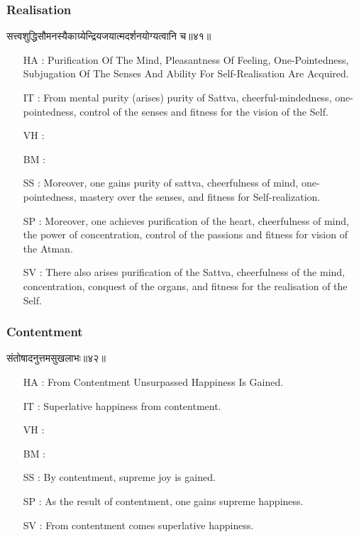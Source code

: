 \begin{frame}[fragile]\frametitle{Realisation}
\begin{sanskrit}
सत्त्वशुद्धिसौमनस्यैकाग्र्येन्द्रियजयात्मदर्शनयोग्यत्वानि च॥४१॥
\end{sanskrit}

	\begin{itemize}
	\item [HA]: Purification Of The Mind, Pleasantness Of Feeling, One-Pointedness, Subjugation Of The Senses And Ability For Self-Realisation Are Acquired.
	\item [IT]: From mental purity (arises) purity of Sattva, cheerful-mindedness, one-pointedness, control of the senses and fitness for the vision of the Self.
	\item [VH]: 
	\item [BM]: 
	\item [SS]: Moreover, one gains purity of sattva, cheerfulness of mind, one-pointedness, mastery over the senses, and fitness for Self-realization.
	\item [SP]: Moreover, one achieves purification of the heart, cheerfulness of mind, the power of concentration, control of the passions and fitness for vision of the Atman.
	\item [SV]: There also arises purification of the Sattva, cheerfulness of the mind, concentration, conquest of the organs, and fitness for the realisation of the Self. 
	\end{itemize}
\end{frame}


\begin{frame}[fragile]\frametitle{Contentment}
\begin{sanskrit}
संतोषादनुत्तमसुखलाभः॥४२॥
\end{sanskrit}

	\begin{itemize}
	\item [HA]: From Contentment Unsurpassed Happiness Is Gained.
	\item [IT]: Superlative happiness from contentment.
	\item [VH]: 
	\item [BM]: 
	\item [SS]: By contentment, supreme joy is gained.
	\item [SP]: As the result of contentment, one gains supreme happiness.
	\item [SV]: From contentment comes superlative happiness. 
	\end{itemize}
\end{frame}


